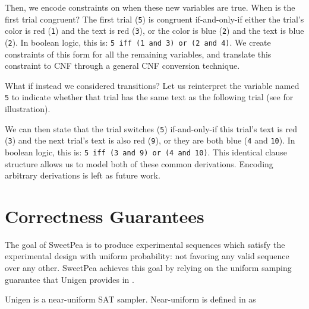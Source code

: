 Then, we encode constraints on when these new variables are true. When is the first trial congruent? The first trial (\texttt{5}) is congruent if-and-only-if either the trial's color is red (\texttt{1}) and the text is red (\texttt{3}), or the color is blue (\texttt{2}) and the text is blue (\texttt{2}). In boolean logic, this is: \texttt{5 iff (1 and 3) or (2 and 4)}. We create constraints of this form for all the remaining variables, and translate this constraint to CNF through a general CNF conversion technique.

What if instead we considered transitions? Let us reinterpret the variable named \texttt{5} to indicate whether that trial has the same text as the following trial (see  for illustration).







We can then state that the trial switches (\texttt{5}) if-and-only-if this trial's text is red (\texttt{3}) and the next trial's text is also red (\texttt{9}), or they are both blue (\texttt{4} and \texttt{10}). In boolean logic, this is: \texttt{5 iff (3 and 9) or (4 and 10)}. This identical clause structure allows us to model both of these common derivations. Encoding arbitrary derivations is left as future work.

\section{Correctness Guarantees}

The goal of SweetPea is to produce experimental sequences which satisfy the experimental design with uniform probability: not favoring any valid sequence over any other. SweetPea achieves this goal by relying on the uniform samping guarantee that Unigen provides in \cite{chakraborty2013scalable}.

Unigen is a near-uniform SAT sampler. Near-uniform is defined in \cite{meel2016constrained} as

